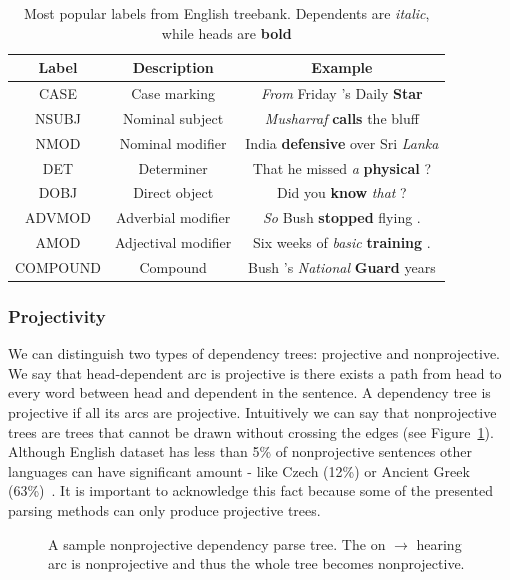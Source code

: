 \begin{table}[!htbp]
    \centering
    \begin{tabular}{c | c | c}
        Label & Description & Example \\ \hline\hline
        CASE & Case marking & \textit{From} Friday 's Daily \textbf{Star} \\
        NSUBJ & Nominal subject & \textit{Musharraf} \textbf{calls} the bluff \\
        NMOD & Nominal modifier & India \textbf{defensive} over Sri \textit{Lanka} \\
        DET & Determiner & That he missed \textit{a} \textbf{physical} ? \\
        DOBJ & Direct object & Did you \textbf{know} \textit{that} ? \\
        ADVMOD & Adverbial modifier & \textit{So} Bush \textbf{stopped} flying . \\
        AMOD & Adjectival modifier & Six weeks of \textit{basic} \textbf{training} . \\
        COMPOUND & Compound & Bush 's \textit{National} \textbf{Guard} years
    \end{tabular}
    \caption{Most popular labels from English treebank. Dependents are \textit{italic},
    while heads are \textbf{bold}}
    \label{tab:label_samples}
\end{table}

\subsubsection{Projectivity}
We can distinguish two types of dependency trees: projective and nonprojective.
We say that head-dependent arc is projective is there exists a path from head
to every word between head and dependent in the sentence. A dependency tree is
projective if all its arcs are projective.
Intuitively we can say that nonprojective trees are trees that cannot be drawn
without crossing the edges (see Figure~\ref{fig:dependency_nonproj}).
Although English dataset has less than 5\% of nonprojective sentences other
languages can have significant amount - like Czech (12\%) or Ancient Greek (63\%)~\cite{straka_parsing_2015}.
It is important to acknowledge this fact because some of the presented parsing
methods can only produce projective trees.

\begin{figure}[!htbp]
  \centering
  \caption{A sample nonprojective dependency parse tree. The on $\rightarrow$ hearing arc is
    nonprojective and thus the whole tree becomes nonprojective.}
  \label{fig:dependency_nonproj}
\end{figure}

